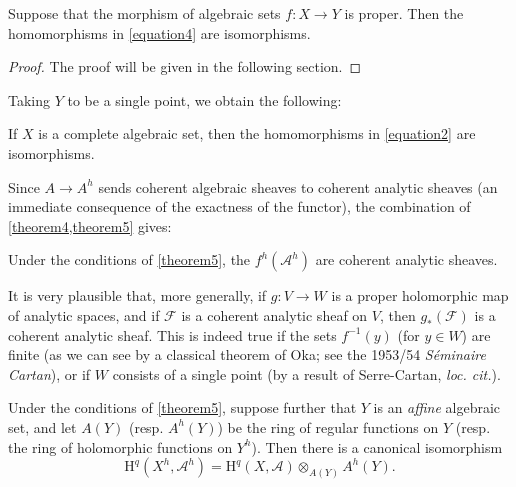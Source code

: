 \documentclass{article}
\theoremstyle{plain}
\newenvironment{theorem}[1]
  {\renewcommand\theinnercustomtheorem{#1}\innercustomtheorem}
  {\endinnercustomtheorem}
\newenvironment{corollary}[1]
  {\renewcommand\theinnercustomcorollary{#1}\innercustomcorollary}
  {\endinnercustomcorollary}
\theoremstyle{definition}
\newcommand{\sh}{\mathscr}
\newcommand{\HH}{\mathrm{H}}
\newcommand{\oldpage}[1]{\marginpar{\footnotesize$\Big\vert$ \textit{p.~#1}}}
\begin{document}
\begin{theorem}{5}
\label{theorem5}
  Suppose that the morphism of algebraic sets $f\colon X\to Y$ is proper.
  Then the homomorphisms in \cref{equation4} are isomorphisms.
\end{theorem}

\begin{proof}
  The proof will be given in the following section.
\end{proof}

Taking $Y$ to be a single point, we obtain the following:

\begin{corollary}{1}
\label{corollary1-5}
  If $X$ is a complete algebraic set, then the homomorphisms in \cref{equation2} are isomorphisms.
\end{corollary}

Since $A\to A^h$ sends coherent algebraic sheaves to coherent analytic sheaves (an immediate consequence of the exactness of the functor), the combination of \cref{theorem4,theorem5} gives:

\begin{corollary}{2}
\label{corollary2-5}
  Under the conditions of \cref{theorem5}, the $f^h(\sh{A}^h)$ are coherent analytic sheaves.
\end{corollary}

\oldpage{2-10}
It is very plausible that, more generally, if $g\colon V\to W$ is a proper holomorphic map of analytic spaces, and if $\sh{F}$ is a coherent analytic sheaf on $V$, then $g_*(\sh{F})$ is a coherent analytic sheaf.
This is indeed true if the sets $f^{-1}(y)$ (for $y\in W$) are finite (as we can see by a classical theorem of Oka; see the 1953/54 \emph{Séminaire Cartan}), or if $W$ consists of a single point (by a result of Serre-Cartan, \emph{loc. cit.}).

\begin{corollary}{3}
\label{corollary3-5}
  Under the conditions of \cref{theorem5}, suppose further that $Y$ is an \emph{affine} algebraic set, and let $A(Y)$ (resp. $A^h(Y)$) be the ring of regular functions on $Y$ (resp. the ring of holomorphic functions on $Y^h$).
  Then there is a canonical isomorphism
  \[
  \label{equation5}
    \HH^q(X^h,\sh{A}^h) = \HH^q(X,\sh{A})\otimes_{A(Y)}A^h(Y).
    \tag{5}
  \]
\end{corollary}
\end{document}
